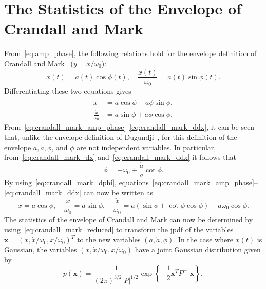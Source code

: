 \documentclass[12pt]{article}
\theoremstyle{plain}
\theoremstyle{definition}
\theoremstyle{remark}
\begin{document}
\section{The Statistics of the Envelope of Crandall and Mark}
\label{sec:crandall_mark}
From~\eqref{eq:amp_phase}, the following relations hold for the envelope definition of Crandall and Mark~\cite{crandall1963} ($y = \dot{x}/\omega_0$):
\begin{equation}
    x(t) = a(t) \cos \phi(t), \quad \frac{\dot{x}(t)}{\omega_0} = a(t) \sin \phi(t).
    \label{eq:crandall_mark_amp_phase}
\end{equation}
Differentiating these two equations gives
\begin{align}
    \dot{x} &= \dot{a} \cos \phi - a \dot{\phi} \sin \phi, \label{eq:crandall_mark_dx} \\
    \frac{\ddot{x}}{\omega_0} &= \dot{a} \sin \phi + a \dot{\phi} \cos \phi. \label{eq:crandall_mark_ddx}
\end{align}
From~\eqref{eq:crandall_mark_amp_phase}--\eqref{eq:crandall_mark_ddx}, it can be seen that, unlike the envelope definition of Dugundji~\cite{dugundji1958}, for this definition of the envelope $a, \dot{a}, \phi$, and $\dot{\phi}$ are not independent variables. In particular, from~\eqref{eq:crandall_mark_dx} and~\eqref{eq:crandall_mark_ddx} it follows that
\begin{equation}
    \dot{\phi} = -\omega_0 + \frac{\dot{a}}{a} \cot \phi.
    \label{eq:crandall_mark_dphi}
\end{equation}
By using~\eqref{eq:crandall_mark_dphi}, equations~\eqref{eq:crandall_mark_amp_phase}--\eqref{eq:crandall_mark_ddx} can now be written as
\begin{equation}
    x = a \cos \phi, \quad \frac{\dot{x}}{\omega_0} = a \sin \phi, \quad \frac{\ddot{x}}{\omega_0} = \dot{a} (\sin \phi + \cot \phi \cos \phi) - a \omega_0 \cos \phi.
    \label{eq:crandall_mark_reduced}
\end{equation}
The statistics of the envelope of Crandall and Mark can now be determined by using~\eqref{eq:crandall_mark_reduced} to transform the jpdf of the variables $\mathbf{x} = (x, \dot{x}/\omega_0, \ddot{x}/\omega_0)^T$ to the new variables $(a, \dot{a}, \phi)$. In the case where $x(t)$ is Gaussian, the variables $(x, \dot{x}/\omega_0, \ddot{x}/\omega_0)$ have a joint Gaussian distribution given by
\begin{equation}
    p(\mathbf{x}) = \frac{1}{(2\pi)^{3/2} |P|^{1/2}} \exp \left\{ -\frac{1}{2} \mathbf{x}^T P^{-1} \mathbf{x} \right\},
    \label{eq:crandall_mark_jpdf}
\end{equation}
\end{document}
